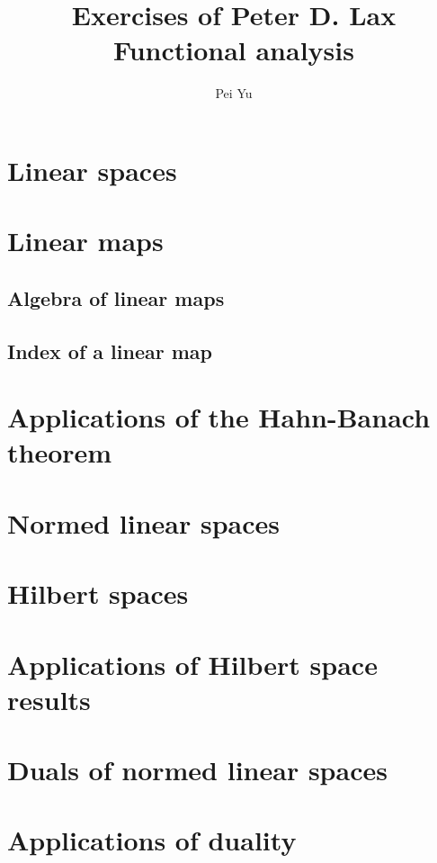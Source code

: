 \documentclass[11pt]{elegantbook}
\title{Exercises of Peter D. Lax Functional analysis}
\author{Pei Yu}
\begin{document}
\maketitle

\frontmatter
\tableofcontents

\mainmatter

\chapter{Linear spaces}

\chapter{Linear maps}
\section{Algebra of linear maps}
\section{Index of a linear map}


\chapter{Applications of the Hahn-Banach theorem}

\chapter{Normed linear spaces}

\chapter{Hilbert spaces}

\chapter{Applications of Hilbert space results}

\chapter{Duals of normed linear spaces}

\chapter{Applications of duality}
\end{document}
